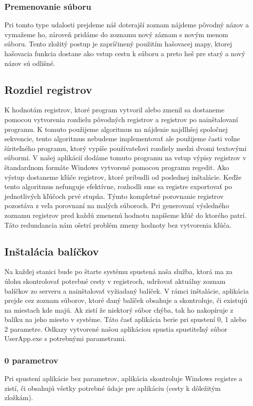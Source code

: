 \subsubsection{Premenovanie súboru}
Pri tomto type udalosti prejdeme náš doterajší zoznam nájdeme pôvodný názov a vymažeme ho, zároveň pridáme do zoznamu nový záznam s novým menom súboru. Tento zložitý postup je zapríčinený použitím hašovacej mapy, ktorej hašovacia funkcia dostane ako vstup cestu k súboru a preto heš pre starý a nový názov sú odlišné.

\subsection{Rozdiel registrov}
K hodnotám registrov, ktoré program vytvoril alebo zmenil sa dostaneme pomocou vytvorenia rozdielu pôvodných registrov a registrov po nainštalovaní programu. K tomuto použijeme algoritmus na nájdenie najdlhšej spoločnej sekvencie, tento algoritmus nebudeme implementovať ale použijeme časti voľne šíriteľného programu, ktorý vypíše používateľovi rozdiely medzi dvomi textovými súbormi. V našej aplikácií dodáme tomuto programu na vstup výpisy registrov v štandardnom formáte Windows vytvorené pomocou programu regedit. Ako výstup dostaneme kľúče registrov, ktoré pribudli od poslednej inštalácie. Keďže tento algoritmus nefunguje efektívne, rozhodli sme sa registre exportovať po jednotlivých kľúčoch prvé stupňa. Týmto kompletné porovnanie registrov pozostáva z veľa porovnaní na malých súboroch. Pri generovaní výsledného zoznamu registrov pred každú zmenenú hodnotu napíšeme kľúč do ktorého patrí. Táto redundancia nám ošetrí problém zmeny hodnoty bez vytvorenia kľúča.

\subsection{Inštalácia balíčkov}
Na každej stanici bude po štarte systému spustená naša služba, ktorá ma za úlohu skontrolovať potrebné cesty v registroch, udržovať aktuálny zoznam balíčkov zo serveru a nainštalovať vyžiadaný balíček. V rámci inštalácie, aplikácia prejde cez zoznam súborov, ktoré daný balíček obsahuje a skontroluje, či existujú na miestach kde majú. Ak zistí že niektorý súbor chýba, tak ho nakopíruje z balíku na jeho miesto v systéme. Táto časť aplikácia berie pri spustení 0, 1 alebo 2 parametre. Odkazy vytvorené našou aplikáciou spustia spustiteľný súbor UserApp.exe s potrebnými parametrami.

\subsubsection{0 parametrov}
Pri spustení aplikácie bez parametrov, aplikácia skontroluje Windows registre a zistí, či obsahujú všetky potrebné údaje pre aplikáciu (cesty k dôležitým zložkám).

